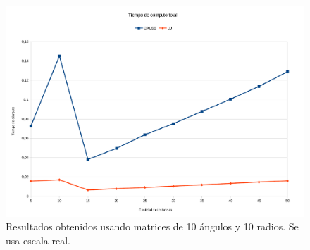 \begin{figure}[H]{}
\centering
\includegraphics[scale=0.5]{graphs/gaussVsLU3.pdf}
\caption{Resultados obtenidos usando matrices de 10 ángulos y 10 radios. Se usa escala real.}
\label{gaussVsLU1}


\end{figure}

